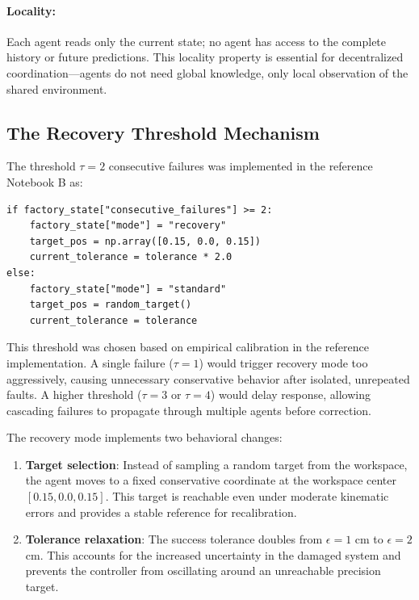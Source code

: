 \documentclass[12pt,a4paper,oneside]{report}
\begin{document}
\paragraph{Locality:} Each agent reads only the current state; no agent has access to the complete history or future predictions. This locality property is essential for decentralized coordination—agents do not need global knowledge, only local observation of the shared environment.

\subsection{The Recovery Threshold Mechanism}

The threshold $\tau = 2$ consecutive failures was implemented in the reference Notebook B as:

\begin{verbatim}
if factory_state["consecutive_failures"] >= 2:
    factory_state["mode"] = "recovery"
    target_pos = np.array([0.15, 0.0, 0.15])
    current_tolerance = tolerance * 2.0
else:
    factory_state["mode"] = "standard"
    target_pos = random_target()
    current_tolerance = tolerance
\end{verbatim}

This threshold was chosen based on empirical calibration in the reference implementation. A single failure ($\tau = 1$) would trigger recovery mode too aggressively, causing unnecessary conservative behavior after isolated, unrepeated faults. A higher threshold ($\tau = 3$ or $\tau = 4$) would delay response, allowing cascading failures to propagate through multiple agents before correction.

The recovery mode implements two behavioral changes:

\begin{enumerate}
    \item \textbf{Target selection}: Instead of sampling a random target from the workspace, the agent moves to a fixed conservative coordinate at the workspace center $[0.15, 0.0, 0.15]$. This target is reachable even under moderate kinematic errors and provides a stable reference for recalibration.
    \item \textbf{Tolerance relaxation}: The success tolerance doubles from $\epsilon = 1$ cm to $\epsilon = 2$ cm. This accounts for the increased uncertainty in the damaged system and prevents the controller from oscillating around an unreachable precision target.
\end{enumerate}
\end{document}
